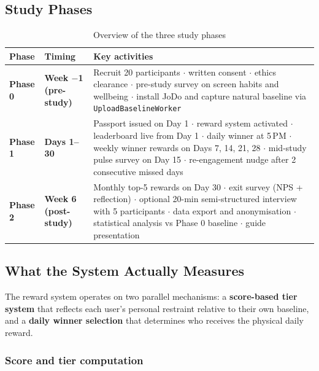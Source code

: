 \documentclass[12pt, a4paper]{article}
\begin{document}
\subsection{Study Phases}

\renewcommand{\arraystretch}{1.4}
\begin{table}[H]
\centering
\caption{Overview of the three study phases}
\begin{tabularx}{\linewidth}{>{\bfseries\color{iitbblue}}l >{\bfseries}l X}
\toprule
\rowcolor{tablehead}
\color{white}Phase & \color{white}Timing & \color{white}Key activities \\
\midrule
Phase 0 & Week $-$1 (pre-study) &
Recruit 20 participants $\cdot$ written consent $\cdot$ ethics clearance $\cdot$ pre-study survey on screen habits and wellbeing $\cdot$ install JoDo and capture natural baseline via \texttt{UploadBaselineWorker} \\
\addlinespace
Phase 1 & Days 1--30 &
Passport issued on Day 1 $\cdot$ reward system activated $\cdot$ leaderboard live from Day 1 $\cdot$ daily winner  at 5\,PM $\cdot$ weekly winner rewards on Days 7, 14, 21, 28 $\cdot$ mid-study pulse survey on Day 15 $\cdot$ re-engagement nudge after 2 consecutive missed days \\
\addlinespace
Phase 2 & Week 6 (post-study) &
Monthly top-5 rewards on Day 30 $\cdot$ exit survey (NPS + reflection) $\cdot$ optional 20-min semi-structured interview with 5 participants $\cdot$ data export and anonymisation $\cdot$ statistical analysis vs Phase 0 baseline $\cdot$ guide presentation \\
\bottomrule
\end{tabularx}
\end{table}

\subsection{What the System Actually Measures}

The reward system operates on two parallel mechanisms: a \textbf{score-based tier system}
that reflects each user's personal restraint relative to their own baseline, and a
\textbf{daily winner selection} that determines who receives the physical daily reward.

\subsubsection*{Score and tier computation}
\end{document}
